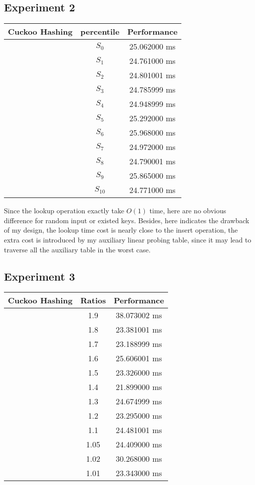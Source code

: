 \documentclass[twoside,11pt]{article}
\begin{document}
\subsection{Experiment 2}
\begin{tabular}{|c|c|c|}
    \hline  
    Cuckoo Hashing  & percentile  &  Performance \\
      \hline  
      & $ S_{0}  $ & 25.062000 ms \\
      & $ S_{1}  $ & 24.761000 ms \\
      & $ S_{2}  $ & 24.801001 ms \\
      & $ S_{3}  $ & 24.785999 ms \\
      & $ S_{4}  $ & 24.948999 ms \\
      & $ S_{5}  $ & 25.292000 ms \\
      & $ S_{6}  $ & 25.968000 ms \\
      & $ S_{7}  $ & 24.972000 ms \\
      & $ S_{8}  $ & 24.790001 ms \\
      & $ S_{9}  $ & 25.865000 ms \\
      & $ S_{10}  $& 24.771000 ms \\
      \hline  

  \end{tabular}

  Since the lookup operation exactly take $O(1)$ time, here are no obvious difference for random input or existed keys. Besides, here indicates the drawback of my design, the lookup time cost is nearly close to the insert operation, the extra cost is introduced by my auxiliary linear probing table, since it may lead to traverse all the auxiliary table in the worst case.

  \subsection{Experiment 3}
  \begin{tabular}{|c|c|c|}
    \hline  
    Cuckoo Hashing  & Ratios &  Performance \\
      \hline  
      & 1.9  & 38.073002 ms \\
      & 1.8  & 23.381001 ms \\
      & 1.7  & 23.188999 ms \\
      & 1.6  & 25.606001 ms \\
      & 1.5  & 23.326000 ms \\
      & 1.4  & 21.899000 ms \\
      & 1.3  & 24.674999 ms \\
      & 1.2  & 23.295000 ms \\
      & 1.1  & 24.481001 ms \\
      & 1.05 & 24.409000 ms \\
      & 1.02 & 30.268000 ms \\
      & 1.01 & 23.343000 ms \\
      \hline  

  \end{tabular}
\end{document}
